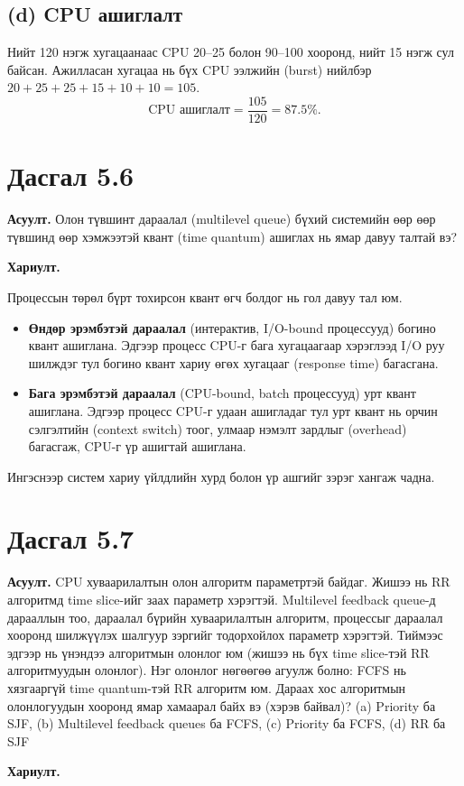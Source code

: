 \documentclass[12pt,a4paper]{article}
\newcommand{\question}[2]{\section{Дасгал #1}\textbf{Асуулт.} #2\par\medskip\textbf{Хариулт.}\par}
\begin{document}
\subsection{(d) CPU ашиглалт}
Нийт 120 нэгж хугацаанаас CPU 20–25 болон 90–100 хооронд, нийт 15 нэгж сул байсан. Ажилласан хугацаа нь бүх CPU ээлжийн (burst) нийлбэр $20+25+25+15+10+10 = 105$.
\[
  \text{CPU ашиглалт} = \frac{105}{120} = \mathbf{87.5\%}.
\]

\question{5.6}{Олон түвшинт дараалал (multilevel queue) бүхий системийн өөр өөр түвшинд өөр хэмжээтэй квант (time quantum) ашиглах нь ямар давуу талтай вэ?}

Процессын төрөл бүрт тохирсон квант өгч болдог нь гол давуу тал юм.
\begin{itemize}[leftmargin=1.5em]
  \item \textbf{Өндөр эрэмбэтэй дараалал} (интерактив, I/O-bound процессууд) богино квант ашиглана. Эдгээр процесс CPU-г бага хугацаагаар хэрэглээд I/O руу шилждэг тул богино квант хариу өгөх хугацааг (response time) багасгана.
  \item \textbf{Бага эрэмбэтэй дараалал} (CPU-bound, batch процессууд) урт квант ашиглана. Эдгээр процесс CPU-г удаан ашигладаг тул урт квант нь орчин сэлгэлтийн (context switch) тоог, улмаар нэмэлт зардлыг (overhead) багасгаж, CPU-г үр ашигтай ашиглана.
\end{itemize}
Ингэснээр систем хариу үйлдлийн хурд болон үр ашгийг зэрэг хангаж чадна.

\question{5.7}{CPU хуваарилалтын олон алгоритм параметртэй байдаг. Жишээ нь RR алгоритмд time slice-ийг заах параметр хэрэгтэй. Multilevel feedback queue-д дарааллын тоо, дараалал бүрийн хуваарилалтын алгоритм, процессыг дараалал хооронд шилжүүлэх шалгуур зэргийг тодорхойлох параметр хэрэгтэй. Тиймээс эдгээр нь үнэндээ алгоритмын олонлог юм (жишээ нь бүх time slice-тэй RR алгоритмуудын олонлог). Нэг олонлог нөгөөгөө агуулж болно: FCFS нь хязгааргүй time quantum-тэй RR алгоритм юм. Дараах хос алгоритмын олонлогуудын хооронд ямар хамаарал байх вэ (хэрэв байвал)? (a) Priority ба SJF, (b) Multilevel feedback queues ба FCFS, (c) Priority ба FCFS, (d) RR ба SJF}
\end{document}
